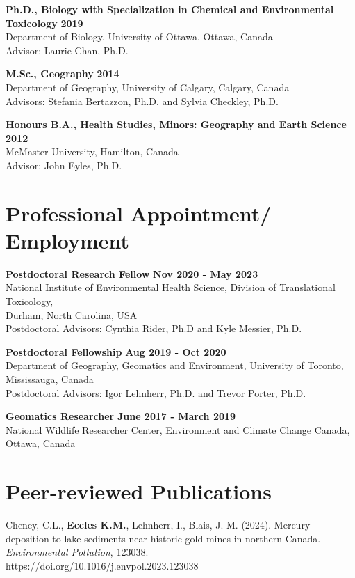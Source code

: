 \documentclass[margin,line]{res}
\begin{document}
\begin{resume}
\textbf{Ph.D., Biology with Specialization in Chemical and Environmental Toxicology} \hfill {\bf 2019}\\
Department of Biology, University of Ottawa, Ottawa, Canada \\
Advisor: Laurie Chan, Ph.D.

\textbf{M.Sc., Geography}  \hfill {\bf 2014}\\
Department of Geography, University of Calgary, Calgary, Canada\\
Advisors:  Stefania Bertazzon, Ph.D. and Sylvia Checkley, Ph.D.

\textbf{Honours B.A., Health Studies, Minors: Geography and Earth Science }\hfill {\bf 2012}\\
McMaster University, Hamilton, Canada\\
Advisor: John Eyles, Ph.D.

\vspace*{.1in}
\section{\sc Professional Appointment/ Employment}

{\bf  Postdoctoral Research Fellow} \hfill {\bf Nov 2020 - May 2023}\\
National Institute of Environmental Health Science, Division of Translational Toxicology,\\
Durham, North Carolina, USA\\
Postdoctoral Advisors: Cynthia Rider, Ph.D and Kyle Messier, Ph.D.

{\bf Postdoctoral Fellowship} \hfill {\bf Aug 2019 - Oct 2020}\\
Department of Geography, Geomatics and Environment, University of Toronto, Mississauga, Canada\\
Postdoctoral Advisors: Igor Lehnherr, Ph.D. and Trevor Porter, Ph.D.

{\bf Geomatics Researcher} \hfill {\bf June 2017 - March 2019}\\
National Wildlife Researcher Center, Environment and Climate Change Canada, Ottawa, Canada
\vspace*{.1in}

\section{\sc Peer-reviewed Publications}

Cheney, C.L., \textbf{Eccles K.M.}, Lehnherr, I., Blais, J. M. (2024). Mercury deposition to lake sediments near historic gold mines in northern Canada. \textit{Environmental Pollution}, 123038.\\
https://doi.org/10.1016/j.envpol.2023.123038
\newpage


\end{resume}
\end{document}
